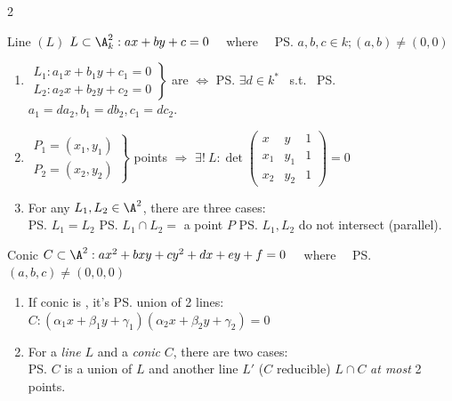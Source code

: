 \documentclass{note}
\begin{document}
\begin{multicols}{2}
    \begin{MyTh}{Line $(L)$}
        $L\subset \A_k^2: ax+by+c=0$ \ \ where \ \ \ps{$a,b,c\in k; (a,b)\neq(0,0)$}

        \begin{enumerate}
            \item $\left.\begin{smallmatrix}
                L_1: a_1x+b_1y+c_1=0 \\
                L_2: a_2x+b_2y+c_2=0
            \end{smallmatrix}\right\}$ are  $\Leftrightarrow$ \ps{\tiny $\exists d\in k^*$} \ s.t. \ \ps{$a_1=da_2, b_1=db_2, c_1=dc_2$.}
            \item $\left.\begin{smallmatrix}
                P_1=(x_1,y_1) \\
                P_2=(x_2,y_2)
            \end{smallmatrix}\right\}$  points $\Rightarrow$ $\exists ! \ L:\det\left(\begin{smallmatrix}
                x & y & 1 \\
                x_1 & y_1 & 1 \\
                x_2 & y_2 & 1
            \end{smallmatrix}\right)=0$ 
            \item For any $L_1,L_2\in \A^2$, there are three cases: \\
             \ps{$L_1=L_2$} \quad {} \ps{$L_1\cap L_2=$ a point $P$} \quad {} \ps{$L_1, L_2$ do not intersect (parallel).}
            
        \end{enumerate}
    \end{MyTh}

    \begin{MyTh}{Conic}
        $C\subset \A^2: ax^2+bxy+cy^2+dx+ey+f=0$ \ \ where \ \ \ps{$(a,b,c)\neq(0,0,0)$}
        
        \begin{enumerate}
            \item If conic is , it's \ps{union of 2 lines}: {\tiny $C: (\alpha_1x+\beta_1y+\gamma_1)(\alpha_2x+\beta_2y+\gamma_2)=0$}
            \item For a \textit{line} $L$ and a \textit{conic} $C$, there are two cases: \\
             \ps{$C$ is a union of $L$ and another line $L'$ ($C$ reducible) \quad {} $L\cap C$ \textit{at most} 2 points.}
        \end{enumerate}
    \end{MyTh}


\end{multicols}
\end{document}
